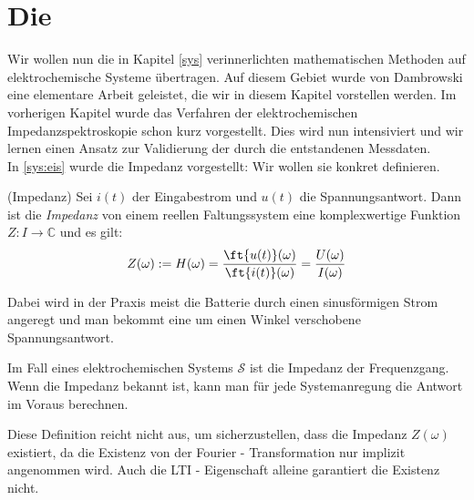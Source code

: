 \chapter{Die \eis}\label{eis}
Wir wollen nun die in Kapitel \ref{sys} verinnerlichten mathematischen Methoden auf elektrochemische Systeme übertragen. Auf diesem Gebiet wurde von Dambrowski \cite{Dambrowski2013} eine elementare Arbeit geleistet, die wir in diesem Kapitel vorstellen werden. Im vorherigen Kapitel wurde das Verfahren der elektrochemischen Impedanzspektroskopie schon kurz vorgestellt. Dies wird nun intensiviert und wir lernen einen Ansatz zur Validierung der durch die \eis entstandenen Messdaten.  \\
In \ref{sys:eis} wurde die Impedanz vorgestellt: Wir wollen sie konkret definieren.

\begin{defi}\label{eis:impedanz} (Impedanz)
	Sei $i(t)$ der Eingabestrom und $u(t)$ die Spannungsantwort. Dann ist die \textit{Impedanz} von einem reellen Faltungssystem eine komplexwertige Funktion $Z: I \rightarrow \mathbb{C}$ und es gilt:
	\begin{align}
		Z(\omega):= H(\omega) = \frac{\ft{u(t)}(\omega)}{\ft{i(t)}(\omega)}	= \frac{U(\omega)}{I(\omega)}
	\end{align} 
\end{defi}
\begin{bem}
	Dabei wird in der Praxis meist die Batterie durch einen sinusförmigen Strom angeregt und man bekommt eine um einen Winkel verschobene Spannungsantwort.
\end{bem}
\begin{bem}
	Im Fall eines elektrochemischen Systems $\mathscr{S}$ ist die Impedanz der Frequenzgang. Wenn die Impedanz bekannt ist, kann man für jede Systemanregung die Antwort im Voraus berechnen. 
\end{bem}
                                                                                                                                                      Diese Definition reicht nicht aus, um sicherzustellen, dass die Impedanz $Z(\omega)$ existiert, da die Existenz von der Fourier - Transformation nur implizit angenommen wird. Auch die LTI - Eigenschaft alleine garantiert die Existenz nicht. \\
                                                                                                                                                      
